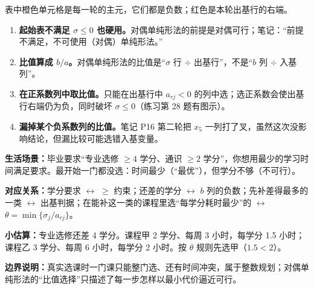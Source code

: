表中橙色单元格是每一轮的主元，它们都是负数；红色是本轮出基行的右端。

\begin{warningbox}
\begin{enumerate}[leftmargin=1.5em]
  \item \textbf{起始表不满足 $\sigma\le0$ 也硬用。}对偶单纯形法的前提是对偶可行；笔记：“前提不满足，不可使用（对偶）单纯形法。”
  \item \textbf{比值算成 $b/a$。}对偶单纯形法的比值是“$\sigma$ 行 $\div$ 出基行”，不是“$b$ 列 $\div$ 入基列”。
  \item \textbf{在正系数列中取比值。}只能在出基行中 $a_{rj}<0$ 的列中选；选正系数会使出基行右端仍为负，同时破坏 $\sigma\le0$（练习第 28 题有图示）。
  \item \textbf{漏掉某个负系数列的比值。}笔记 P16 第二轮把 $x_5$ 一列打了叉，虽然这次没影响结论，但漏比较可能选错入基变量。
\end{enumerate}
\end{warningbox}

\begin{lifebox}
\begin{minipage}[t]{0.55\linewidth}
\textbf{生活场景：}毕业要求“专业选修 $\ge4$ 学分、通识 $\ge2$ 学分”，你想用最少的学习时间满足要求。最开始一门都没选：时间最少（“最优”），但学分不够（不可行）。\par
\textbf{对应关系：}学分要求 $\leftrightarrow$ $\ge$ 约束；还差的学分 $\leftrightarrow$ $b$ 列的负数；先补差得最多的一类 $\leftrightarrow$ 出基判据；在能补这一类的课程里选“每学分耗时最少”的 $\leftrightarrow$ $\theta=\min\{\sigma_j/a_{rj}\}$。\par
\textbf{小估算：}专业选修还差 4 学分。课程甲 2 学分、每周 3 小时，每学分 1.5 小时；课程乙 3 学分、每周 6 小时，每学分 2 小时。按 $\theta$ 规则先选甲（$1.5<2$）。\par
\textbf{边界说明：}真实选课时一门课只能整门选、还有时间冲突，属于整数规划；对偶单纯形法的“比值选择”只描述了每一步怎样以最小代价逼近可行。
\end{minipage}\hfill
\begin{minipage}[t]{0.41\linewidth}\vspace{0pt}\centering
{}
\end{minipage}
\end{lifebox}

